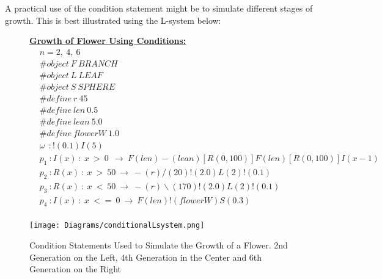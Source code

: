 \begin{flushleft}
\vspace{5mm}

\vspace{5mm}

A practical use of the condition statement might be to simulate different stages of growth. This is best illustrated using the L-system below: \\

\vspace{5mm}

\begin{figure}[htbp]
\raggedright
\textbf{\underline{Growth of Flower Using Conditions:}} \\

\begin{equation} \label{conditional l-system example}
\begin{aligned}
	&n=2,~4,~6 \\
	&\#object~ F~ BRANCH \\
 	&\#object~ L~ LEAF \\
	&\#object~ S~ SPHERE \\
	&\#define~ r~ 45 \\
	&\#define~ len~ 0.5 \\
	&\#define~ lean~ 5.0 \\
	&\#define~ flowerW~ 1.0 \\
	&\omega~~ : !(0.1)I(5)\\
	&p_1~ :  I(x)~ :~ x~ >~ 0~~ \rightarrow~ F(len)-(lean)[R({0, 100})]F(len)[R({0, 100})]I(x-1)\\
	&p_2~ :  R(x)~ :~ x~ >~ 50~ \rightarrow~ -(r)/(20)!(2.0)L(2)!(0.1)\\
	&p_3~ :  R(x)~ :~ x~ <~ 50~ \rightarrow~ -(r)\backslash(170)!(2.0)L(2)!(0.1)\\
	&p_4~ :  I(x)~ :~ x~ <=~ 0~ \rightarrow~ F(len)!(flowerW)S(0.3)\\
\end{aligned}
\end{equation}

	{\centering
		\vspace{7px}
		\texttt{[image: Diagrams/conditionalLsystem.png]}
		\caption{Condition Statements Used to Simulate the Growth of a Flower. 2nd Generation on the Left, 4th Generation in the Center and 6th Generation on the Right}
	}
\end{figure}

\FloatBarrier

\end{flushleft}


